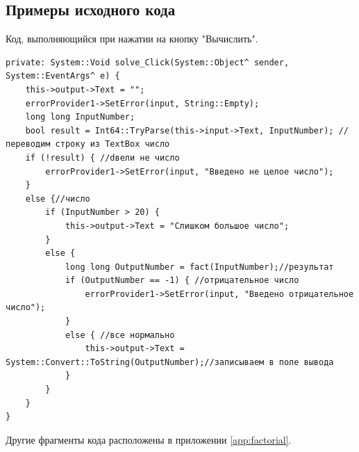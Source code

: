 \subsection{Примеры исходного кода}

Код, выполняющийся при нажатии на кнопку "Вычислить".
\begin{verbatim}
private: System::Void solve_Click(System::Object^ sender, System::EventArgs^ e) {
	this->output->Text = "";
	errorProvider1->SetError(input, String::Empty);
	long long InputNumber;
	bool result = Int64::TryParse(this->input->Text, InputNumber); //переводим строку из TextBox число
	if (!result) { //dвели не число
		errorProvider1->SetError(input, "Введено не целое число");
	}
	else {//число
		if (InputNumber > 20) {
			this->output->Text = "Слишком большое число";
		}
		else {
			long long OutputNumber = fact(InputNumber);//результат
			if (OutputNumber == -1) { //отрицательное число
				errorProvider1->SetError(input, "Введено отрицательное число");
			}
			else { //все нормально
				this->output->Text = System::Convert::ToString(OutputNumber);//записываем в поле вывода
			}
		}
	}
}
\end{verbatim}
Другие фрагменты кода расположены в приложении \ref{app:factorial}.
\sectionbreak